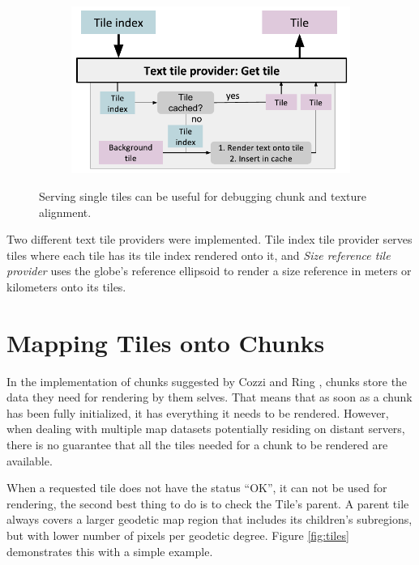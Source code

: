 \begin{figure}[htbp]
    \centering
    \begin{subfigure}[bt]{0.8\textwidth}
        \includegraphics[width=\textwidth]{figures/implementation/tileprovider/texttileprovider_gettile.pdf}
    \end{subfigure}
    \caption{Serving single tiles can be useful for debugging chunk and texture alignment.}
    \label{fig:texttileprovider_gettile}
\end{figure}

Two different text tile providers were implemented. Tile index tile provider serves tiles where each tile has its tile index rendered onto it, and \emph{Size reference tile provider} uses the globe's reference ellipsoid to render a size reference in meters or kilometers onto its tiles.

\section{Mapping Tiles onto Chunks}

In the implementation of chunks suggested by Cozzi and Ring \cite{cozzi11}, chunks store the data they need for rendering by them selves. That means that as soon as a chunk has been fully initialized, it has everything it needs to be rendered. However, when dealing with multiple map datasets potentially residing on distant servers, there is no guarantee that all the tiles needed for a chunk to be rendered are available.

When a requested tile does not have the status ``OK'', it can not be used for rendering, the second best thing to do is to check the Tile's parent. A parent tile always covers a larger geodetic map region that includes its children's subregions, but with lower number of pixels per geodetic degree. Figure \ref{fig:tiles} demonstrates this with a simple example.

